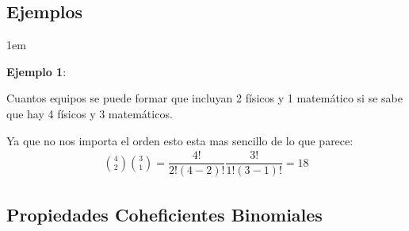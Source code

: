 \documentclass[12pt, fleqn]{report}                             %
\newenvironment{SmallIndentation}[1][0.75em]                    %
        {\begin{adjustwidth}{#1}{}\begin{footnotesize}}             %
        {\end{footnotesize}\end{adjustwidth}}                       %
\theoremstyle{break}                                            %
\begin{document}
            \vspace{1em}
            \subsection{Ejemplos}

                \begin{SmallIndentation}[1em]
                    \textbf{Ejemplo 1}:
                    
                    Cuantos equipos se puede formar que incluyan 2 físicos y 1 matemático
                    si se sabe que hay 4 físicos y 3 matemáticos.

                    Ya que no nos importa el orden esto esta mas sencillo de lo que parece:
                    \begin{align*}
                        {4 \choose 2} {3 \choose 1}
                            = \dfrac{4!}{2!(4-2)!}\dfrac{3!}{1!(3-1)!}
                            = 18                     
                    \end{align*}                    
                
                \end{SmallIndentation}
                    


            \clearpage
            \subsection{Propiedades Coheficientes Binomiales}
\end{document}
